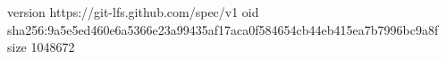 version https://git-lfs.github.com/spec/v1
oid sha256:9a5e5ed460e6a5366e23a99435af17aca0f584654cb44eb415ea7b7996bc9a8f
size 1048672

